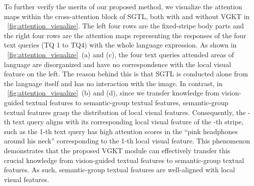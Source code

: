 To further verify the merits of our proposed method, we visualize the attention maps within the cross-attention block of SGTL, both with and without VGKT in  \figurename~\ref{fig:attention_visualize}. The left four rows are the fixed-stripe body parts and the right four rows are the attention maps representing the responses of the four text queries (TQ 1 to TQ4) with the whole language expression. 
As shown in \figurename~\ref{fig:attention_visualize}~(a) and (c), the four text queries attended areas of language are disorganized and have no correspondence with the local visual feature on the left.
The reason behind this is that SGTL is conducted alone from the language itself and has no interaction with the image.
In contrast, in \figurename~\ref{fig:attention_visualize}~(b) and (d), 
since we transfer knowledge from vision-guided textual features to semantic-group textual features, semantic-group textual features grasp the distribution of local visual features. 
Consequently, the -th text query aligns with its corresponding local visual feature of the -th stripe, such as the 1-th text query has high attention scores in the ``pink headphones around his neck'' corresponding to the 1-th local visual feature.  This phenomenon demonstrates that the proposed VGKT module can effectively transfer this crucial knowledge from vision-guided textual features to semantic-group textual features. As such, semantic-group textual features are well-aligned with local visual features.